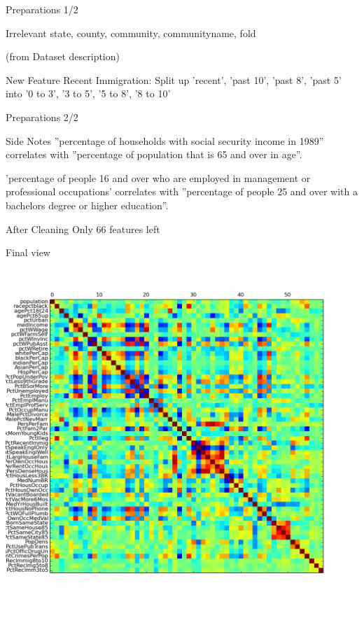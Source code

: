 \documentclass[12pt]{beamer}
\begin{document}
\begin{frame}{Preparations 1/2}
\begin{block}{Irrelevant}
state, county, community, communityname, fold

(from Dataset description)
\end{block}

\begin{block}{New Feature}
Recent Immigration: Split up 'recent', 'past 10', 'past 8', 'past 5' into '0 to 3', '3 to 5', '5 to 8', '8 to 10'
\end{block}
\end{frame}

\begin{frame}{Preparations 2/2}
\begin{block}{Side Notes}
''percentage of households with social security income in 1989''
correlates with ''percentage of population that is 65 and over in age''.

'percentage of people 16 and over who are employed in management or professional occupations'
correlates with ''percentage of people 25 and over with a bachelors degree or higher education''.
\end{block}

\begin{block}{After Cleaning}
Only 66 features left
\end{block}
\end{frame}

\begin{frame}{Final view}
\includegraphics[height=\textheight,width=\textwidth,keepaspectratio]{plots/communities_final.png}
\end{frame}
\end{document}
